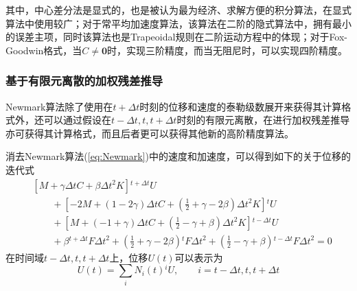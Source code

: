 其中，中心差分法是显式的，也是被认为最为经济、求解方便的积分算法，在显式算法中使用较广；对于常平均加速度算法，该算法在二阶的隐式算法中，拥有最小的误差主项\cite{Dahlquist1963a}，同时该算法也是Trapeoidal规则在二阶运动方程中的体现；对于Fox-Goodwin格式，当$C\neq\mathbf{0}$时，实现三阶精度，而当无阻尼时，可以实现四阶精度。

\subsubsection{基于有限元离散的加权残差推导}
Newmark算法除了使用在$t+\Delta t$时刻的位移和速度的泰勒级数展开来获得其计算格式外，还可以通过假设在$t-\Delta t,t,t+\Delta t$时刻的有限元离散，在进行加权残差推导亦可获得其计算格式\cite{Zienkiewicz1977a}，而且后者更可以获得其他新的高阶精度算法。

消去Newmark算法(\ref{eq:Newmark})中的速度和加速度，可以得到如下的关于位移的迭代式
\begin{equation}
\begin{aligned}
&[M+\gamma\Delta tC+\beta\Delta t^2K]{^{t+\Delta t}\!U}\\
&\qquad+[-2M+(1-2\gamma)\Delta tC+(\frac{1}{2}+\gamma-2\beta)\Delta t^2K]{^t\!U}\\
&\qquad+[M+(-1+\gamma)\Delta tC+(\frac12-\gamma+\beta)\Delta t^2K]{^{t-\Delta t}\!U}\\
&\qquad+\beta{^{t+\Delta t}\!F}\Delta t^2+(\frac{1}{2}+\gamma-2\beta){^t\!F}\Delta t^2+(\frac{1}{2}-\gamma+\beta){^{t-\Delta t}\!F}\Delta t^2=0
\end{aligned}\label{eq:NewmarkDisF}
\end{equation}
在时间域$t-\Delta t,t,t+\Delta t$上，位移$U(t)$可以表示为
\begin{equation}
U(t)=\sum_{i}N_i(t){^i\!U},\qquad i=t-\Delta t,t,t+\Delta t
\end{equation}

